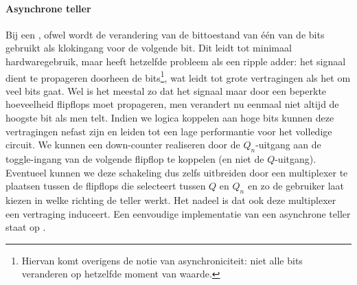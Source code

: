 \paragraph{Asynchrone teller}
Bij een ,  ofwel  wordt de verandering van de bittoestand van \'e\'en van de bits gebruikt als klokingang voor de volgende bit. Dit leidt tot minimaal hardwaregebruik, maar heeft hetzelfde probleem als een ripple adder: het signaal dient te propageren doorheen de bits\footnote{Hiervan komt overigens de notie van asynchroniciteit: niet alle bits veranderen op hetzelfde moment van waarde.}, wat leidt tot grote vertragingen als het om veel bits gaat. Wel is het meestal zo dat het signaal maar door een beperkte hoeveelheid flipflops moet propageren, men verandert nu eenmaal niet altijd de hoogste bit als men telt. Indien we logica koppelen aan hoge bits kunnen deze vertragingen nefast zijn en leiden tot een lage performantie voor het volledige circuit. We kunnen een down-counter realiseren door de $Q_n$-uitgang aan de toggle-ingang van de volgende flipflop te koppelen (en niet de $Q$-uitgang). Eventueel kunnen we deze schakeling dus zelfs uitbreiden door een multiplexer te plaatsen tussen de flipflops die selecteert tussen $Q$ en $Q_n$ en zo de gebruiker laat kiezen in welke richting de teller werkt. Het nadeel is dat ook deze multiplexer een vertraging induceert. Een eenvoudige implementatie van een asynchrone teller staat op .

